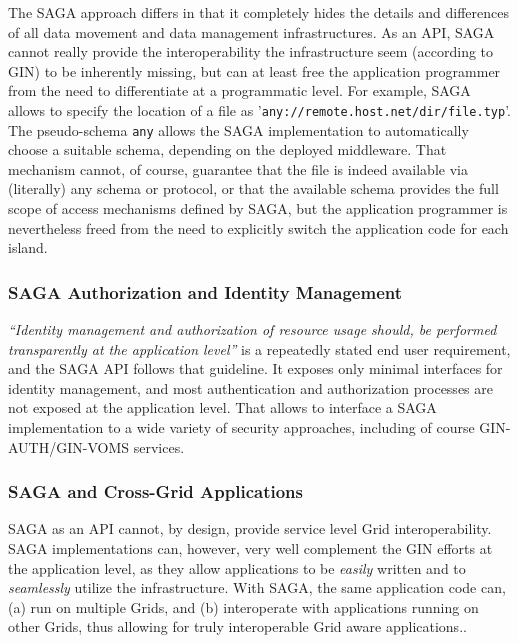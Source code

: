 \documentclass[conference,final]{IEEEtran}
\newcommand{\I}{\textit}
\newcommand{\T}{\texttt}
\newcommand{\jhanote}[1]{ {\textcolor{red} { ***Jha: #1 }}}
\begin{document}
The SAGA approach differs in that it completely hides the details and
differences of all data movement and data management infrastructures.
As an API, SAGA cannot really provide the interoperability the
infrastructure seem (according to GIN) to be inherently missing, but
can at least free the application programmer from the need to
differentiate at a programmatic level.  For example, SAGA allows to
specify the location of a file as
'\T{any://remote.host.net/dir/file.typ}'.  The pseudo-schema \T{any}
allows the SAGA implementation to automatically choose a suitable
schema, depending on the deployed middleware.  That mechanism cannot,
of course, guarantee that the file is indeed available via (literally)
any schema or protocol, or that the available schema provides the full
scope of access mechanisms defined by SAGA, but the application
programmer is nevertheless freed from the need to explicitly
switch the application code for each island.

\subsubsection{SAGA Authorization and Identity Management}

 \I{``Identity management and authorization of resource usage
 should, be performed transparently at the application level''} is a
 repeatedly stated end user requirement, and the SAGA API follows that
 guideline.  It exposes only minimal interfaces for identity
 management, and most authentication and authorization processes
 are not exposed at the application level.  That allows to
 interface a SAGA implementation to a wide variety of security
 approaches, including of course GIN-AUTH/GIN-VOMS services.

\subsubsection{SAGA and Cross-Grid Applications}
SAGA as an API cannot, by design, provide service level Grid
interoperability.  SAGA implementations can, however, very well
complement the GIN efforts at the application level, as they allow
applications to be \I{easily} written and to \I{seamlessly} utilize
the infrastructure.  With SAGA, the same application code can, (a)
run on multiple Grids, and (b) interoperate with applications running
on other Grids, thus allowing for truly interoperable Grid aware
applications..
\end{document}
